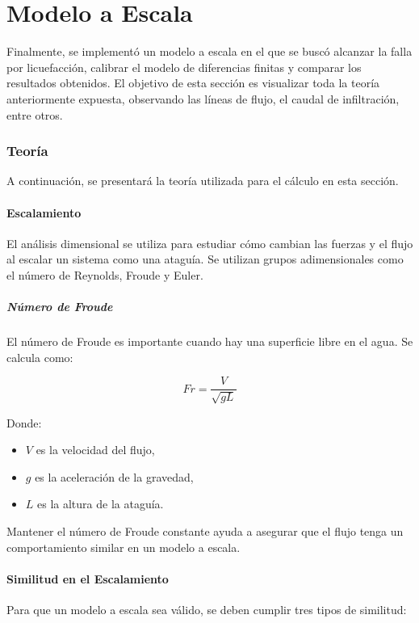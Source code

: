 \part{Modelo a Escala}

Finalmente, se implementó un modelo a escala en el que se buscó alcanzar la falla por licuefacción, calibrar el modelo de diferencias finitas y comparar los resultados obtenidos. El objetivo de esta sección es visualizar toda la teoría anteriormente expuesta, observando las líneas de flujo, el caudal de infiltración, entre otros.

\section{Teoría}

A continuación, se presentará la teoría utilizada para el cálculo en esta sección.

\subsection{Escalamiento}
El análisis dimensional se utiliza para estudiar cómo cambian las fuerzas y el flujo al escalar un sistema como una ataguía. Se utilizan grupos adimensionales como el número de Reynolds, Froude y Euler.

\subsubsection{Número de Froude}
El número de Froude es importante cuando hay una superficie libre en el agua. Se calcula como:

\begin{equation}
Fr = \frac{V}{\sqrt{g L}}
\end{equation}

Donde:
\begin{itemize}
    \item $V$ es la velocidad del flujo,
    \item $g$ es la aceleración de la gravedad,
    \item $L$ es la altura de la ataguía.
\end{itemize}

Mantener el número de Froude constante ayuda a asegurar que el flujo tenga un comportamiento similar en un modelo a escala.

\subsection{Similitud en el Escalamiento}
Para que un modelo a escala sea válido, se deben cumplir tres tipos de similitud:

